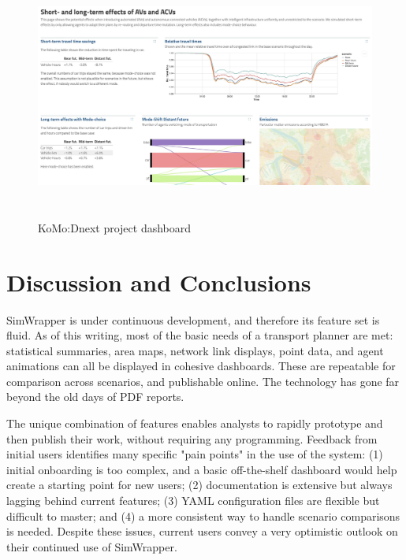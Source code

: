 \documentclass[3p,times,procedia]{elsarticle}
\begin{document}
\begin{figure}
  \centering
  \includegraphics[width=\textwidth,height=3.2in]{images/fig-komod-next.jpg}
  \caption{KoMo:Dnext project dashboard}
  \label{fig:chart3}
\end{figure}


\section{Discussion and Conclusions}

SimWrapper is under continuous development, and therefore its feature set is fluid. As of this writing, most of the basic needs of a transport planner are met: statistical summaries, area maps, network link displays, point data, and agent animations can all be displayed in cohesive dashboards. These are repeatable for comparison across scenarios, and publishable online. The technology has gone far beyond the old days of PDF reports.

The unique combination of features enables analysts to rapidly prototype and then publish their work, without requiring any programming. Feedback from initial users identifies many specific "pain points" in the use of the system: (1) initial onboarding is too complex, and a basic off-the-shelf dashboard would help create a starting point for new users; (2) documentation is extensive but always lagging behind current features; (3) YAML configuration files are flexible but difficult to master; and (4) a more consistent way to handle scenario comparisons is needed. Despite these issues, current users convey a very optimistic outlook on their continued use of SimWrapper.
\end{document}

